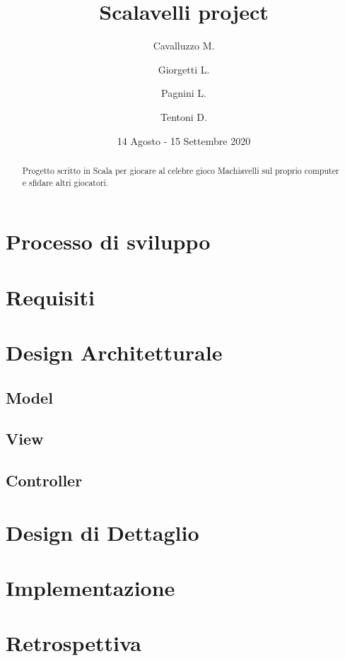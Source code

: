 \documentclass{article}
\title{Scalavelli project}
\date{14 Agosto - 15 Settembre 2020}
\author{
Cavalluzzo M.
\and
Giorgetti L.
\and
Pagnini L.
\and
Tentoni D.
}
\begin{document}
    \maketitle
    \newpage

    \begin{abstract}
        Progetto scritto in Scala per giocare al celebre gioco Machiavelli sul proprio computer e sfidare altri giocatori.
    \end{abstract}

    \tableofcontents

    \newpage

    \section{Processo di sviluppo}\label{sec:processo-di-sviluppo}
    

    \section{Requisiti}\label{sec:requisiti}
    


    \section{Design Architetturale}\label{sec:design-architetturale}

    \subsection{Model}

    \subsection{View}

    \subsection{Controller}

    \newpage


    \section{Design di Dettaglio}\label{sec:design-di-dettaglio}
    


    \section{Implementazione}\label{sec:implementazione}
    


    \section{Retrospettiva}\label{sec:retrospettiva}
    
\end{document}
